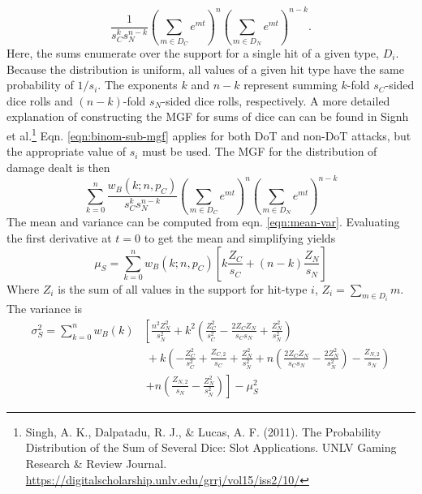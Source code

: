 \documentclass{article}
\begin{document}
        

        \begin{equation}\label{eqn:binom-sub-mgf}
            \frac{1}{s_C^k s_N^{n-k}} \left( \sum_{m \in D_{C}} e^{m t} \right)^n 
            \left( \sum_{m \in D_{N}} e^{m t} \right)^{n-k}.
        \end{equation}
        Here, the sums enumerate over the support for a single hit of a given type, $D_i$. Because the distribution is uniform, all values of a given hit type have the same probability of $1/s_i$. The exponents $k$ and $n-k$ represent summing $k$-fold $s_C$-sided dice rolls and $(n-k)$-fold $s_N$-sided dice rolls, respectively. A more detailed explanation of constructing the MGF for sums of dice can can be found in Signh et al.\footnote{Singh, A. K., Dalpatadu, R. J., \& Lucas, A. F. (2011). The Probability Distribution of the Sum of Several Dice: Slot Applications. UNLV Gaming Research \& Review Journal. \url{https://digitalscholarship.unlv.edu/grrj/vol15/iss2/10/}} Eqn. \ref{eqn:binom-sub-mgf} applies for both DoT and non-DoT attacks, but the appropriate value of $s_i$ must be used. The MGF for the distribution of damage dealt is then
        \begin{equation}\label{eqn:binom-mgf}
            \sum_{k=0}^{n}
            \frac{w_B(k;n,p_C)}{s_C^k s_N^{n-k}} \left( \sum_{m \in D_{C}} e^{m t} \right)^n 
            \left( \sum_{m \in D_{N}} e^{m t} \right)^{n-k}
        \end{equation}
        The mean and variance can be computed from eqn. \ref{eqn:mean-var}. Evaluating the first derivative at $t=0$ to get the mean and simplifying yields
        \begin{equation}\label{eqn:binom-mean}
            \mu_{S} = \sum_{k=0}^n w_B(k;n,p_C) \left[k \frac{Z_C}{s_C} + (n-k) \frac{Z_N}{s_N}\right]
        \end{equation}
        Where $Z_i$ is the sum of all values in the support for hit-type $i$, $Z_i = \sum_{m \in D_{i}} m $. The variance is
        \begin{equation}\label{eqn:binom-var}
            \begin{split}
                \sigma_{S}^2 = \sum_{k=0}^n w_B(k)   & \left[ \frac{n^2 Z_N^2}{s_N^2} \right.+ k^2 \left(\frac{Z_C^2}{s_C^2} - \frac{2 Z_C Z_N}{s_C s_N} + \frac{Z_N^2}{s_N^2}\right)  \\
                & \: + k \left(-\frac{Z_C^2}{s_C^2} + \frac{Z_{C,2}}{s_C} + \frac{Z_N^2}{s_N^2} + 
                n \left(\frac{2 Z_C Z_N}{s_C s_N} - \frac{2 Z_N^2}{s_N^2}\right) - \frac{Z_{N,2}}{s_N}\right) \\
                & \: \left.+ n \left(\frac{Z_{N,2}}{s_N} - \frac{Z_N^2}{s_N^2} \right)\right] - \mu_{S}^2              
            \end{split}
        \end{equation}
\end{document}
